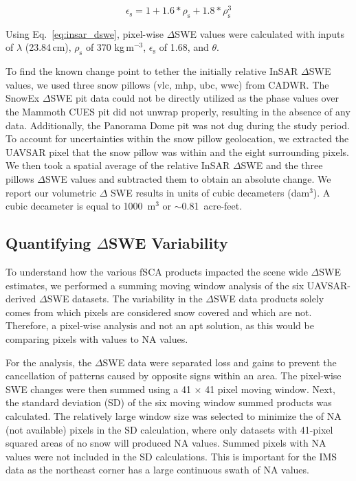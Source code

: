 \begin{equation}
\epsilon_\mathrm{s} = 1 + 1.6 * \rho_\mathrm{s} + 1.8 * \rho_\mathrm{s}^3
\label{eq:dens_to_perm}
\end{equation}


\noindent Using Eq.~\ref{eq:insar_dswe}, pixel-wise $\Delta$SWE values were calculated with inputs of $\lambda$ (23.84\,cm), $\rho_\mathrm{s}$ of 370 kg\,m$^{-3}$, $\epsilon_\mathrm{s}$ of 1.68, and $\theta$. 

To find the known change point to tether the initially relative InSAR $\Delta$SWE values, we used three snow pillows (vlc, mhp, ubc, wwc) from CADWR. The SnowEx $\Delta$SWE pit data could not be directly utilized as the phase values over the Mammoth CUES pit did not unwrap properly, resulting in the absence of any data. Additionally, the Panorama Dome pit was not dug during the study period. To account for uncertainties within the snow pillow geolocation, we extracted the UAVSAR pixel that the snow pillow was within and the eight surrounding pixels. We then took a spatial average of the relative InSAR $\Delta$SWE and the three pillows $\Delta$SWE values and subtracted them to obtain an absolute change. We report our volumetric $\Delta$ SWE results in units of cubic decameters (dam$^{3}$). A cubic decameter is equal to 1000~m$^{3}$ or $\sim$0.81~acre-feet.

\hypertarget{ch4-methods-2}{\subsection{Quantifying $\Delta$SWE Variability}\label{ch4-methods-1}}

To understand how the various fSCA products impacted the scene wide $\Delta$SWE estimates, we performed a summing moving window analysis of the six UAVSAR-derived $\Delta$SWE datasets. The variability in the $\Delta$SWE data products solely comes from which pixels are considered snow covered and which are not. Therefore, a pixel-wise analysis and not an apt solution, as this would be comparing pixels with values to NA values.

For the analysis, the $\Delta$SWE data were separated loss and gains to prevent the cancellation of patterns caused by opposite signs within an area. The pixel-wise SWE changes were then summed using a 41 $\times$ 41 pixel moving window. Next, the standard deviation (SD) of the six moving window summed products was calculated. The relatively large window size was selected to minimize the of NA (not available) pixels in the SD calculation, where only datasets with 41-pixel squared areas of no snow will produced NA values. Summed pixels with NA values were not included in the SD calculations. This is important for the IMS data as the northeast corner has a large continuous swath of NA values.

